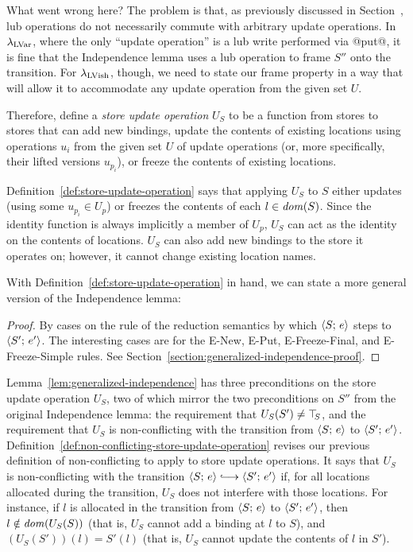 What went wrong here?  The problem is that, as previously discussed in
Section~\either{\ref{subsection:lvars-generalizing-from-least-upper-bound-writes}}{\ref{s:lvars-generalizing}},
lub operations do not necessarily commute with arbitrary update
operations.  In $\lambda_{\textrm{LVar}}$, where the only ``update operation'' is
a lub write performed via @put@, it is fine that the Independence
lemma uses a lub operation to frame $S''$ onto the transition. For
$\lambda_{\textrm{LVish}}$, though, we need to state our frame property in a way
that will allow it to accommodate any update operation from the given
set $U$.

Therefore,  define a \emph{store update operation} $U_S$ to be a
function from stores to stores that can add new bindings, update the
contents of existing locations using operations $u_i$ from the given
set $U$ of update operations (or, more specifically, their lifted
versions $u_{p_i}$), or freeze the contents of existing locations.

\DefStoreUpdateOperation

Definition~\ref{def:store-update-operation} says that applying $U_S$
to $S$ either updates (using some $u_{p_i} \in U_p$) or freezes the
contents of each $l \in \mathit{dom}(S)$.  Since the identity function is
always implicitly a member of $U_p$, $U_S$ can act as the identity on
the contents of locations.  $U_S$ can also add new bindings to the
store it operates on; however, it cannot change existing location
names.

With Definition~\ref{def:store-update-operation} in hand, we can state
a more general version of the Independence lemma:

\LemGeneralizedIndependence
\ifdefined\DISSERTATION
\begin{proof}
  By cases on the rule of the reduction semantics by which
  $\langle S;\, e \rangle$ steps to $\langle S';\, e' \rangle$.  The interesting cases
  are for the {\sc E-New}, {\sc E-Put}, {\sc E-Freeze-Final}, and {\sc
    E-Freeze-Simple} rules.  See
  Section~\ref{section:generalized-independence-proof}.
\end{proof}
\fi

Lemma~\ref{lem:generalized-independence} has three preconditions on
the store update operation $U_S$, two of which mirror the two
preconditions on $S''$ from the original Independence lemma: the
requirement that $U_S(S') \neq \top\hspace{-0.85mm}_{S}$, and the requirement that $U_S$
is non-conflicting with the transition from $\langle S;\, e \rangle$ to
$\langle S';\, e' \rangle$.
Definition~\ref{def:non-conflicting-store-update-operation} revises
our previous definition of non-conflicting to apply to store update
operations.  It says that $U_S$ is non-conflicting with the transition
$\config{S}{e} \parstepsto \config{S'}{e'}$ if, for all locations
allocated during the transition, $U_S$ does not interfere with those
locations.  For instance, if $l$ is allocated in the transition from
$\langle S;\, e \rangle$ to $\langle S';\, e' \rangle$, then $l \notin \mathit{dom}(U_S(S))$
(that is, $U_S$ cannot add a binding at $l$ to $S$), and $(U_S(S'))(l)
= S'(l)$ (that is, $U_S$ cannot update the contents of $l$ in $S'$).

